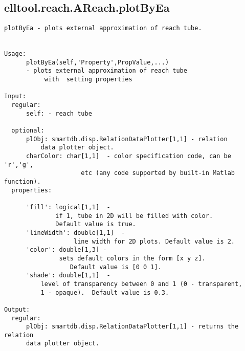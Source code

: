 \subsection{\texorpdfstring{elltool.reach.AReach.plotByEa}{plotByEa}}\label{method:elltool.reach.AReach.plotByEa}
\begin{verbatim}
plotByEa - plots external approximation of reach tube.


Usage:
      plotByEa(self,'Property',PropValue,...)
      - plots external approximation of reach tube
           with  setting properties

Input:
  regular:
      self: - reach tube

  optional:
      plObj: smartdb.disp.RelationDataPlotter[1,1] - relation
          data plotter object.
      charColor: char[1,1]  - color specification code, can be 'r','g',
                     etc (any code supported by built-in Matlab function).
  properties:

      'fill': logical[1,1]  -
              if 1, tube in 2D will be filled with color.
              Default value is true.
      'lineWidth': double[1,1]  -
                   line width for 2D plots. Default value is 2.
      'color': double[1,3] -
               sets default colors in the form [x y z].
                  Default value is [0 0 1].
      'shade': double[1,1]  -
          level of transparency between 0 and 1 (0 - transparent,
          1 - opaque).  Default value is 0.3.

Output:
  regular:
      plObj: smartdb.disp.RelationDataPlotter[1,1] - returns the relation
      data plotter object.
\end{verbatim}
